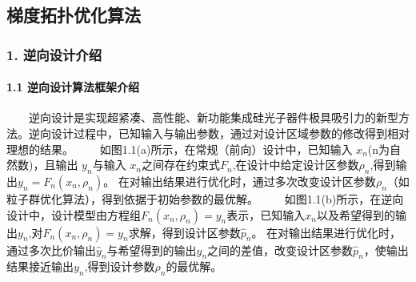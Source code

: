 \documentclass[a4paper,10pt,english]{sphinxmanual}
\begin{document}
\sphinxstepscope


\subsection{梯度拓扑优化算法}
\label{\detokenize{_u7b80_u4ecb/_u6838_u5fc3_u8bbe_u8ba1_u4f18_u5316_u7b97_u6cd5/_u68af_u5ea6_u62d3_u6251_u4f18_u5316_u6a21_u5757/_u68af_u5ea6_u62d3_u6251_u4f18_u5316_u7b97_u6cd5:id1}}\label{\detokenize{_u7b80_u4ecb/_u6838_u5fc3_u8bbe_u8ba1_u4f18_u5316_u7b97_u6cd5/_u68af_u5ea6_u62d3_u6251_u4f18_u5316_u6a21_u5757/_u68af_u5ea6_u62d3_u6251_u4f18_u5316_u7b97_u6cd5::doc}}

\subsubsection{1. 逆向设计介绍}
\label{\detokenize{_u7b80_u4ecb/_u6838_u5fc3_u8bbe_u8ba1_u4f18_u5316_u7b97_u6cd5/_u68af_u5ea6_u62d3_u6251_u4f18_u5316_u6a21_u5757/_u68af_u5ea6_u62d3_u6251_u4f18_u5316_u7b97_u6cd5:id2}}

\paragraph{1.1 逆向设计算法框架介绍}
\label{\detokenize{_u7b80_u4ecb/_u6838_u5fc3_u8bbe_u8ba1_u4f18_u5316_u7b97_u6cd5/_u68af_u5ea6_u62d3_u6251_u4f18_u5316_u6a21_u5757/_u68af_u5ea6_u62d3_u6251_u4f18_u5316_u7b97_u6cd5:id3}}
\sphinxAtStartPar
  逆向设计是实现超紧凑、高性能、新功能集成硅光子器件极具吸引力的新型方法。逆向设计过程中，已知输入与输出参数，通过对设计区域参数的修改得到相对理想的结果。
  如图1.1(a)所示，在常规（前向）设计中，已知输入 \(x_n\)(n为自然数)，且输出 \(y_n\)与输入 \(x_n\)之间存在约束式\(F_n\),在设计中给定设计区参数\(ρ_n\),得到输出\(y_n=F_n(x_n,ρ_n)\)。
在对输出结果进行优化时，通过多次改变设计区参数\(ρ_n\)（如粒子群优化算法），得到依据于初始参数的最优解。
  如图1.1(b)所示，在逆向设计中，设计模型由方程组\(F_n(x_n,ρ_n)=y_n\)表示，已知输入\(x_n\)以及希望得到的输出\(y_n\),对\(F_n(x_n,ρ_n)=y_n\)求解，得到设计区参数\(\hat{p}_n\)。
在对输出结果进行优化时，通过多次比价输出\(\hat{y}_n\)与希望得到的输出\(y_n\)之间的差值，改变设计区参数\(\hat{p}_n\)，使输出结果接近输出\(y_n\),得到设计参数\(ρ_n\)的最优解。


\sphinxAtStartPar
{}
\end{document}
